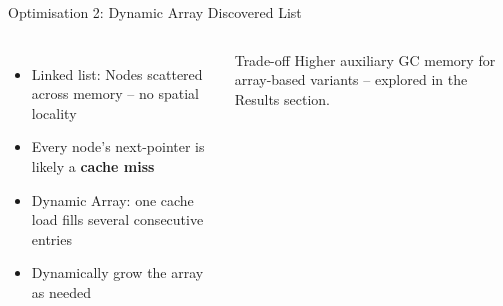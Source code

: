 \documentclass[aspectratio=169]{beamer}
\begin{document}
\begin{frame}{Optimisation 2: Dynamic Array Discovered List}
\begin{columns}[T]
        \small
        \begin{itemize}
            \item Linked list: Nodes scattered across memory -- no spatial locality
            \item Every node's next-pointer is likely a \textbf{cache miss}
            \item Dynamic Array: one cache load fills several consecutive entries
            \item Dynamically grow the array as needed
        \end{itemize}
        \vspace{0.4em}
        \begin{alertblock}{\small Trade-off}
            \small Higher auxiliary GC memory for array-based variants -- explored in the Results section.
        \end{alertblock}
    \end{columns}
\end{frame}
\end{document}
